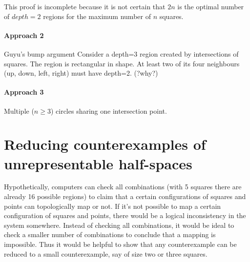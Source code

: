 \documentclass{NSF}
\begin{document}
This proof is incomplete because it is not certain that $2n$ is the optimal number of $depth=2$ regions for the maximum number of $n$ squares.

\paragraph{Approach 2} Guyu's bump argument
Consider a depth=3 region created by intersections of squares. The region is rectangular in shape. At least two of its four neighbours (up, down, left, right) must have depth=2. (?why?)

\paragraph{Approach 3} Multiple ($n\geq3$) circles sharing one intersection point.


\section{Reducing counterexamples of unrepresentable half-spaces}
Hypothetically, computers can check all combinations (with 5 squares there are already 16 possible regions) to claim that a certain configurations of squares and points can topologically map or not. If it's not possible to map a certain configuration of squares and points, there would be a logical inconsistency in the system somewhere. Instead of checking all combinations, it would be ideal to check a smaller number of combinations  to conclude that a mapping is impossible. Thus it would be helpful to show that any counterexample can be reduced to a small counterexample, say of size two or three squares.
\end{document}
